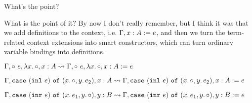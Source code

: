 \documentclass{beamer}
\begin{document}
\begin{frame}{What's the point?}

What is the point of it? By now I don't really remember, but I think it was that we add definitions to the context, i.e. $\extenddef{\Gamma}{x}{A}{e}$, and then we turn the term-related context extensions into smart constructors, which can turn ordinary variable bindings into definitions.

\vspace{1em}

$\extendfun{\extendappl{\Gamma}{e}}{x}{A} \leadsto \extendfundef{\extendappl{\Gamma}{e}}{x}{A}{e}$ \\

\vspace{1em}

$\extendcasel{\Gamma}{(\inl{e})}{x}{A}{y.\, e_2} \leadsto \extendcaseldef{\Gamma}{(\inl{e})}{y.\, e_2}{x}{A}{e}$ \\

\vspace{1em}

$\extendcaser{\Gamma}{(\inr{e})}{x.\, e_1}{y}{B} \leadsto \extendcaserdef{\Gamma}{(\inr{e})}{x.\, e_1}{y}{B}{e}$ \\

\end{frame}
\end{document}
